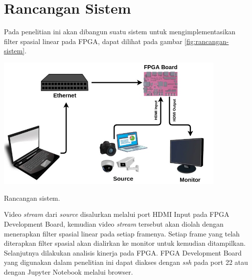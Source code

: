 \section{Rancangan Sistem}
Pada penelitian ini akan dibangun suatu sistem untuk mengimplementasikan filter spasial linear pada FPGA, dapat dilihat pada gambar \ref{fig:rancangan-sistem}.
\begin{afigure}
    \includegraphics[width=0.85\textwidth, center]{images/rancangan-sistem.jpg}
    \caption{Rancangan sistem.}
    \label{fig:rancangan-sistem}
\end{afigure}

Video \textit{stream} dari \textit{source} disalurkan melalui port HDMI Input pada FPGA Development Board, kemudian video \textit{stream} tersebut akan diolah dengan menerapkan filter spasial linear pada setiap framenya. Setiap frame yang telah diterapkan filter spasial akan dialirkan ke monitor untuk kemudian ditampilkan. Selanjutnya dilakukan analisis kinerja pada FPGA. FPGA Development Board yang digunakan dalam penelitian ini dapat diakses dengan \textit{ssh} pada port 22 atau dengan Jupyter Notebook melalui browser.

\pagebreak

